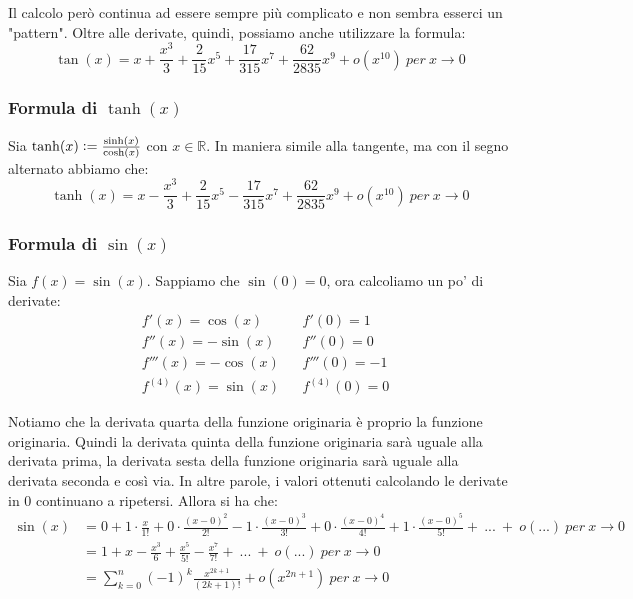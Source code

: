 \documentclass{article}
\begin{document}
\noindent Il calcolo però continua ad essere sempre più complicato e non sembra esserci un "pattern". Oltre alle derivate, quindi, possiamo anche utilizzare la formula:
\begin{equation*}
    \tan(x) = x + \frac{x^3}{3} + \frac{2}{15}x^5 + \frac{17}{315}x^7 + \frac{62}{2835}x^9 + o(x^{10}) \ per \ x \to 0
\end{equation*}

\subsubsection{Formula di $\tanh(x)$}
Sia $\tanh(x) \vcentcolon = \frac{\sinh(x)}{\cosh(x)}$ con $x \in \mathbb{R}$. In maniera simile alla tangente, ma con il segno alternato abbiamo che:
\begin{equation*}
    \tanh(x) = x - \frac{x^3}{3} + \frac{2}{15}x^5 - \frac{17}{315}x^7 + \frac{62}{2835}x^9 + o(x^{10}) \ per \ x \to 0
\end{equation*}

\subsubsection{Formula di $\sin(x)$}
Sia $f(x) = \sin(x)$. Sappiamo che $\sin(0) = 0$, ora calcoliamo un po' di derivate:
\begin{align*}
    & f'(x) = \cos(x) && f'(0) = 1 \\
    & f''(x) = -\sin(x) && f''(0) = 0 \\
    & f'''(x) = -\cos(x) && f'''(0) = -1 \\
    & f^{(4)}(x) = \sin(x) && f^{(4)}(0) = 0
\end{align*}

\noindent Notiamo che la derivata quarta della funzione originaria è proprio la funzione originaria. Quindi la derivata quinta della funzione originaria sarà uguale alla derivata prima, la derivata sesta della funzione originaria sarà uguale alla derivata seconda e così via. In altre parole, i valori ottenuti calcolando le derivate in $0$ continuano a ripetersi. Allora si ha che:
\begin{align*}
    \sin(x) &= 0 + 1 \cdot \frac{x}{1!} + 0 \cdot \frac{(x - 0)^2}{2!} - 1 \cdot \frac{(x - 0)^3}{3!} + 0 \cdot \frac{(x - 0)^4}{4!} + 1 \cdot \frac{(x - 0)^5}{5!} + \ ... \ + \ o(...) \ per \ x \to 0 \\
    &= 1 + x - \frac{x^3}{6} + \frac{x^5}{5!} - \frac{x^7}{7!} + \ ... \ + \ o(...) \ per \ x \to 0 \\
    &= \sum_{k = 0}^n (-1)^k \frac{x^{2k + 1}}{(2k + 1)!} + o(x^{2n + 1}) \ per \ x \to 0
\end{align*}
\end{document}
